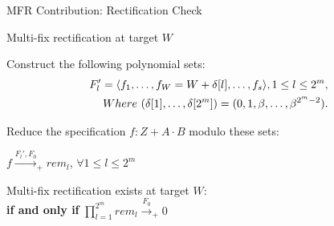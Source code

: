 
\begin{frame}{\large MFR Contribution: Rectification Check}
\bi
	\item Multi-fix rectification at target $W$
	\vspace{0.1in}
	\bi
		\item Construct the following polynomial sets:
		\begin{align*}
			F_l' =\langle f_1,\dots,f_W=W+\delta[l],\dots,f_s\rangle,1 \leq l \leq 2^m, \\
  			Where~(\delta[1],\dots,\delta[2^{m}]) =(0,1,\beta,\dots,\beta^{2^m-2}).
		\end{align*}
		\pause
		\item Reduce the specification $f: Z+A\cdot B$ modulo these sets: 
		\bi
			\item $f\xrightarrow{F_l', F_0}_+rem_l $, $\forall 1 \leq l \leq 2^m$
		\ei
		\vspace{0.2in}
		\pause
		\item Multi-fix rectification exists at target $W$: \\  
				\centering
				{\bf if and only if} $ \prod_{l=1}^{2^m} rem_l \xrightarrow{F_0}_+0$
	\ei
\ei
\end{frame}

